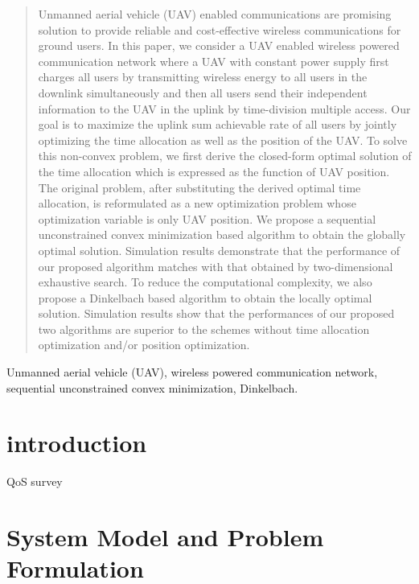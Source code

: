 \documentclass[journal]{IEEEtran}
\begin{document}
\maketitle
\begin{abstract}
Unmanned aerial vehicle (UAV) enabled communications are promising solution to provide reliable and cost-effective wireless communications
for ground users. In this paper, we consider a UAV enabled wireless powered communication network where a UAV with constant power supply first charges all users by transmitting wireless energy to all users in the downlink simultaneously and then all users send their independent information to the UAV in the uplink by time-division multiple access. Our goal is to maximize the uplink sum achievable rate of all users by jointly optimizing the time allocation as well as the position of the UAV. To solve this non-convex problem, we first derive the closed-form optimal solution of the time allocation which is expressed as the function of UAV position. The original problem, after substituting the derived optimal time allocation, is reformulated as a new optimization problem whose optimization variable is only UAV position. We propose a sequential unconstrained convex minimization based algorithm to obtain the globally optimal solution. Simulation results demonstrate that the performance of our proposed algorithm matches with that obtained by two-dimensional exhaustive search. To reduce the computational complexity, we also propose a Dinkelbach based algorithm to obtain the locally optimal solution. Simulation results show that the performances of our proposed two algorithms are superior to the schemes without time allocation optimization and/or position optimization.
\end{abstract}
\begin{IEEEkeywords} Unmanned aerial vehicle (UAV), wireless powered communication network, sequential unconstrained convex minimization, Dinkelbach.
\end{IEEEkeywords}
\IEEEpeerreviewmaketitle
	
\section{introduction}

QoS  survey
\section{System Model and Problem Formulation}
\end{document}
